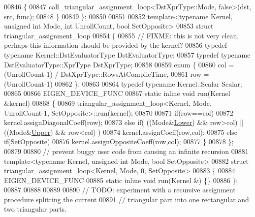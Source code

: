 \begin{DoxyCode}
00846   \{
00847     call\_triangular\_assignment\_loop<DstXprType::Mode, false>(dst, src, func);  
00848   \}
00849 \};
00850 
00851 
00852 \textcolor{keyword}{template}<\textcolor{keyword}{typename} Kernel, \textcolor{keywordtype}{unsigned} \textcolor{keywordtype}{int} Mode, \textcolor{keywordtype}{int} UnrollCount, \textcolor{keywordtype}{bool} SetOpposite>
00853 \textcolor{keyword}{struct }triangular\_assignment\_loop
00854 \{
00855   \textcolor{comment}{// FIXME: this is not very clean, perhaps this information should be provided by the kernel?}
00856   \textcolor{keyword}{typedef} \textcolor{keyword}{typename} Kernel::DstEvaluatorType DstEvaluatorType;
00857   \textcolor{keyword}{typedef} \textcolor{keyword}{typename} DstEvaluatorType::XprType DstXprType;
00858   
00859   \textcolor{keyword}{enum} \{
00860     col = (UnrollCount-1) / DstXprType::RowsAtCompileTime,
00861     row = (UnrollCount-1) %
00862   \};
00863   
00864   \textcolor{keyword}{typedef} \textcolor{keyword}{typename} Kernel::Scalar Scalar;
00865 
00866   EIGEN\_DEVICE\_FUNC
00867   \textcolor{keyword}{static} \textcolor{keyword}{inline} \textcolor{keywordtype}{void} run(Kernel &kernel)
00868   \{
00869     triangular\_assignment\_loop<Kernel, Mode, UnrollCount-1, SetOpposite>::run(kernel);
00870     
00871     \textcolor{keywordflow}{if}(row==col)
00872       kernel.assignDiagonalCoeff(row);
00873     \textcolor{keywordflow}{else} \textcolor{keywordflow}{if}( ((Mode&\hyperlink{group__enums_gga39e3366ff5554d731e7dc8bb642f83cda891792b8ed394f7607ab16dd716f60e6}{Lower}) && row>col) || ((Mode&\hyperlink{group__enums_gga39e3366ff5554d731e7dc8bb642f83cda6bcb58be3b8b8ec84859ce0c5ac0aaec}{Upper}) && row<col) )
00874       kernel.assignCoeff(row,col);
00875     \textcolor{keywordflow}{else} \textcolor{keywordflow}{if}(SetOpposite)
00876       kernel.assignOppositeCoeff(row,col);
00877   \}
00878 \};
00879 
00880 \textcolor{comment}{// prevent buggy user code from causing an infinite recursion}
00881 \textcolor{keyword}{template}<\textcolor{keyword}{typename} Kernel, \textcolor{keywordtype}{unsigned} \textcolor{keywordtype}{int} Mode, \textcolor{keywordtype}{bool} SetOpposite>
00882 \textcolor{keyword}{struct }triangular\_assignment\_loop<Kernel, Mode, 0, SetOpposite>
00883 \{
00884   EIGEN\_DEVICE\_FUNC
00885   \textcolor{keyword}{static} \textcolor{keyword}{inline} \textcolor{keywordtype}{void} run(Kernel &) \{\}
00886 \};
00887 
00888 
00889 
00890 \textcolor{comment}{// TODO: experiment with a recursive assignment procedure splitting the current}
00891 \textcolor{comment}{//       triangular part into one rectangular and two triangular parts.}

\end{DoxyCode}
